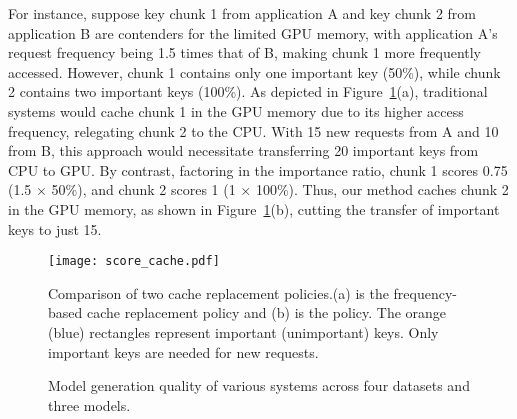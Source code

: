 For instance, suppose key chunk 1 from application A and key chunk 2 from
application B are contenders for the limited GPU memory, with application A's
request frequency being 1.5 times that of B, making chunk 1 more frequently
accessed. However, chunk 1 contains only one important key (50\%), while chunk 2
contains two important keys (100\%).
As depicted in Figure~\ref{fig:score_cache}(a), traditional systems would cache
chunk 1 in the GPU memory due to its higher access frequency, relegating chunk 2 to
the CPU. With 15 new requests from A and 10 from B, this approach would
necessitate transferring 20 important keys from CPU to GPU.
By contrast, factoring in the importance ratio, chunk 1 scores 0.75 (1.5 $\times$
50\%), and chunk 2 scores 1 (1 $\times$ 100\%). Thus, our method caches chunk 2 in
the GPU memory, as shown in Figure~\ref{fig:score_cache}(b), cutting the transfer of
important keys to just 15.

\begin{figure}
	\centering
	\texttt{[image: score\_cache.pdf]}
	\caption{Comparison of two cache replacement policies.(a) is the
	frequency-based cache replacement policy and (b) is the \techbb{} policy. The orange (blue) rectangles
	represent important (unimportant) keys. Only important keys are needed for
	new requests.}
	\label{fig:score_cache}
	\vspace{-0.1in}
\end{figure}


\begin{figure*}
	\hspace{0.1in}
	\hspace{0.2in}
	
	\vspace{-0.1in}
	\caption{
		Model generation quality of various systems across four datasets and three models.}
	\label{fig:overall_acc}
	\vspace{-0.1in}
\end{figure*}

